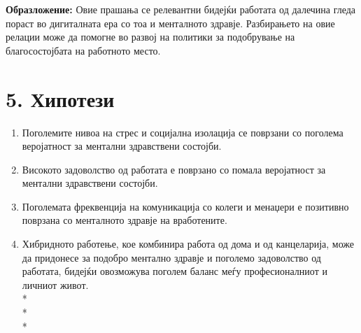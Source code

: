 \documentclass[12pt]{article}
\begin{document}
\textbf{Образложение:}  
Овие прашања се релевантни бидејќи работата од далечина гледа пораст во дигиталната ера со тоа и менталното здравје. Разбирањето на овие релации може да помогне во развој на политики за подобрување на благосостојбата на работното место.  

\section*{5. Хипотези}
\begin{enumerate}
    \item Поголемите нивоа на стрес и социјална изолација се поврзани со поголема веројатност за ментални здравствени состојби.
    \item Високото задоволство од работата е поврзано со помала веројатност за ментални здравствени состојби.
    \item Поголемата фреквенција на комуникација со колеги и менаџери е позитивно поврзана со менталното здравје на вработените.
    \item Хибридното работење, кое комбинира работа од дома и од канцеларија, може да придонесе за подобро ментално здравје и поголемо задоволство од работата, бидејќи овозможува поголем баланс меѓу професионалниот и личниот живот.
    \\*
    \\*
    \\*
\end{enumerate}
\end{document}
